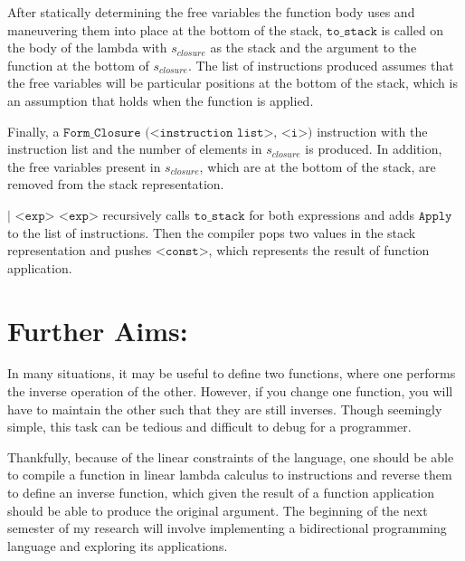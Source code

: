 \documentclass[11pt]{article}
\begin{document}
After statically determining the free variables the function body uses and maneuvering them into place at the bottom of the stack, $\texttt{to\_stack}$ is called on the body of the lambda with $s_{closure}$ as the stack and the argument to the function at the bottom of $s_{closure}$. The list of instructions produced assumes that the free variables will be particular positions at the bottom of the stack, which is an assumption that holds when the function is applied. 

Finally, a $\texttt{Form\_Closure (<instruction list>,  <i>)}$ instruction with the instruction list and the number of elements in $s_{closure}$ is produced. In addition, the free variables present in $s_{closure}$, which are at the bottom of the stack, are removed from the stack representation.

\medskip

\hspace{10mm}$\texttt{| <exp> <exp>}$ recursively calls $\texttt{to\_stack}$ for both expressions and adds $\texttt{Apply}$ to the list of instructions. Then the compiler pops two values in the stack representation and pushes $\texttt{<const>}$, which represents the result of function application.

\medskip

\section*{Further Aims:}

In many situations, it may be useful to define two functions, where one performs the inverse operation of the other. However, if you change one function, you will have to maintain the other such that they are still inverses. Though seemingly simple, this task can be tedious and difficult to debug for a programmer. 

\medskip

Thankfully, because of the linear constraints of the language, one should be able to compile a function in linear lambda calculus to instructions and reverse them to define an inverse function, which given the result of a function application should be able to produce the original argument. The beginning of the next semester of my research will involve implementing a bidirectional programming language and exploring its applications.
\end{document}
